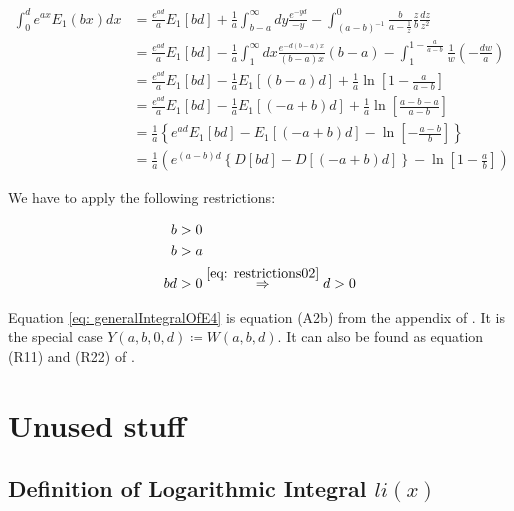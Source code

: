 \documentclass[bibliography=totocnumbered]{scrartcl}
\begin{document}
	\begin{align}
		\int_{0}^{d}e^{ax}E_1\left(bx\right)dx&=\frac{e^{ad}}{a}E_1\left[bd\right]+\frac{1}{a}\int_{b-a}^{\infty}dy\frac{e^{-yd}}{-y}-\int_{\left(a-b\right)^{-1}}^{0}\frac{b}{a-\frac{1}{z}}\frac{z}{b}\frac{dz}{z^2}\\
		&=\frac{e^{ad}}{a}E_1\left[bd\right]-\frac{1}{a}\int_{1}^{\infty}dx\frac{e^{-d\left(b-a\right)x}}{\left(b-a\right)x}\left(b-a\right)-\int_{1}^{1-\frac{a}{a-b}}\frac{1}{w}\left(-\frac{dw}{a}\right)\\
		&=\frac{e^{ad}}{a}E_1\left[bd\right]-\frac{1}{a}E_1\left[\left(b-a\right)d\right]+\frac{1}{a}\ln{\left[1-\frac{a}{a-b}\right]}\\
		&=\frac{e^{ad}}{a}E_1\left[bd\right]-\frac{1}{a}E_1\left[\left(-a+b\right)d\right]+\frac{1}{a}\ln{\left[\frac{a-b-a}{a-b}\right]}\\
		&=\frac{1}{a}\left\{e^{ad}E_1\left[bd\right]-E_1\left[\left(-a+b\right)d\right]-\ln{\left[-\frac{a-b}{b}\right]}\right\}\\
		&=\frac{1}{a}\left(e^{\left(a-b\right)d}\left\{D\left[bd\right]-D\left[\left(-a+b\right)d\right]\right\}-\ln{\left[1-\frac{a}{b}\right]}\right)\label{eq: generalIntegralOfE4}
	\end{align}
	
	We have to apply the following restrictions:
	
	\begin{subequations}
		\begin{align}
			b&>0\label{eq: restrictions01}\\
			b&>a\label{eq: restrictions02}\\
			bd&>0\overset{\eqref{eq: restrictions02}}{\Rightarrow}d>0
		\end{align}
	\end{subequations}
	
	Equation \eqref{eq: generalIntegralOfE4} is equation (A2b) from the appendix of \cite{boer1990calc}. It is the special case $Y\left(a,b,0,d\right)\coloneqq{}W\left(a,b,d\right)$. It can also be found as equation (R11) and (R22) of \cite{sherman}.
	
	\clearpage
	\printbibliography
	\clearpage
	\appendix
	
	\section{Unused stuff}
	
		\subsection[Definition of Logarithmic Integral li(x)]{Definition of Logarithmic Integral $li\left(x\right)$}
		\label{appsubsec: li}
		
\end{document}

